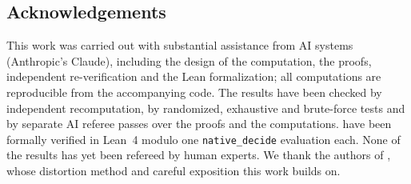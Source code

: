 \documentclass[11pt]{amsart}
\theoremstyle{plain}
\theoremstyle{definition}
\numberwithin{equation}{section}
\begin{document}
\subsection*{Acknowledgements}
This work was carried out with substantial assistance from AI systems (Anthropic's Claude), including the design
of the computation, the proofs, independent re-verification and the Lean formalization; all computations are
reproducible from the accompanying code. The results have been checked by independent recomputation, by randomized,
exhaustive and brute-force tests and by separate AI referee passes over the proofs and the computations.
 have been formally verified in Lean~4 modulo one \texttt{native\_decide} evaluation each.
None of the results has yet been refereed by human experts. We thank the
authors of \cite{BBMST}, whose distortion method and careful exposition this work builds on.



\appendix

\end{document}
